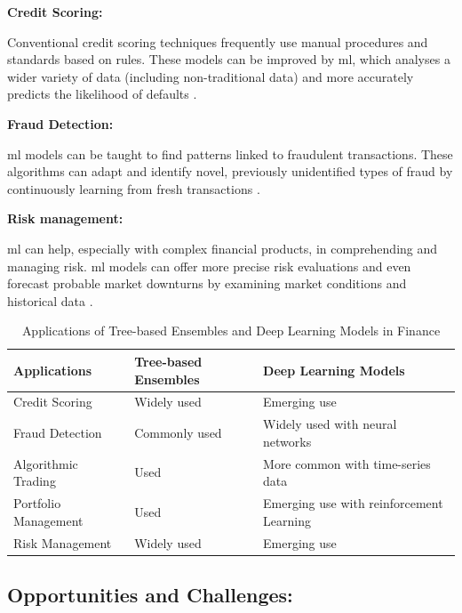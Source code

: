 \smallskip

\textbf{Credit Scoring:} 

Conventional credit scoring techniques frequently use manual procedures and standards based on rules. These models can be improved by \gls{ml}, which analyses a wider variety of data (including non-traditional data) and more accurately predicts the likelihood of defaults \citep{DBLP:journals/eor/LessmannBST15}.

\smallskip

\textbf{Fraud Detection:} 

\gls{ml} models can be taught to find patterns linked to fraudulent transactions. These algorithms can adapt and identify novel, previously unidentified types of fraud by continuously learning from fresh transactions \citep{10.1214/ss/1042727940}.

\goodbreak



\textbf{Risk management:} 

\gls{ml} can help, especially with complex financial products, in comprehending and managing risk. \gls{ml} models can offer more precise risk evaluations and even forecast probable market downturns by examining market conditions and historical data \citep{DBLP:journals/eswa/YehYT09}.

\begin{table}[H]
\centering
\begin{tabular}{|l|l|p{5cm}|}
\hline
\textbf{Applications} & \textbf{Tree-based Ensembles} & \textbf{Deep Learning Models} \\
\hline
Credit Scoring & Widely used & Emerging use \\
\hline
Fraud Detection & Commonly used & Widely used with neural networks \\
\hline
Algorithmic Trading & Used & More common with time-series data \\
\hline
Portfolio Management & Used & Emerging use
with reinforcement Learning \\
\hline
Risk Management & Widely used & Emerging use \\
\hline
\end{tabular}
\caption{Applications of Tree-based Ensembles and Deep Learning Models in Finance}
\citep{ravi2015survey}
\label{table:applications_comparison}
\end{table}

\goodbreak

\subsection{Opportunities and Challenges:}

